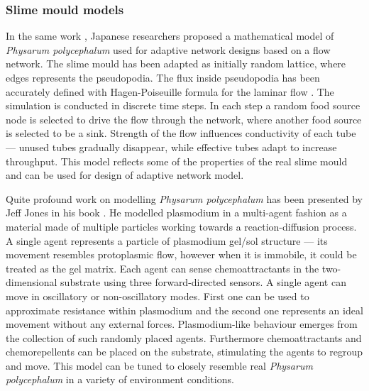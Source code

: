 \subsubsection{Slime mould models}

In the same work \cite{tero2010rules}, Japanese researchers proposed a mathematical model of \textit{Physarum polycephalum} used for adaptive network designs based on a flow network. The slime mould has been adapted as initially random lattice, where edges represents the pseudopodia. The flux inside pseudopodia has been accurately defined with Hagen-Poiseuille formula for the laminar flow \cite{sutera1993history}. The simulation is conducted in discrete time steps. In each step a random food source node is selected to drive the flow through the network, where another food source is selected to be a sink. Strength of the flow influences conductivity of each tube --- unused tubes gradually disappear, while effective tubes adapt to increase throughput. This model reflects some of the properties of the real slime mould and can be used for design of adaptive network model.

Quite profound work on modelling \textit{Physarum polycephalum} has been presented by Jeff Jones in his book \cite{jones2015pattern}. He modelled plasmodium in a multi-agent fashion as a material made of multiple particles working towards a reaction-diffusion process. A single agent represents a particle of plasmodium gel/sol structure --- its movement resembles protoplasmic flow, however when it is immobile, it could be treated as the gel matrix. Each agent can sense chemoattractants in the two-dimensional substrate using three forward-directed sensors. A single agent can move in oscillatory or non-oscillatory modes. First one can be used to approximate resistance within plasmodium and the second one represents an ideal movement without any external forces. Plasmodium-like behaviour emerges from the collection of such randomly placed agents. Furthermore chemoattractants and chemorepellents can be placed on the substrate, stimulating the agents to regroup and move. This model can be tuned to closely resemble real \textit{Physarum polycephalum} in a variety of environment conditions.

